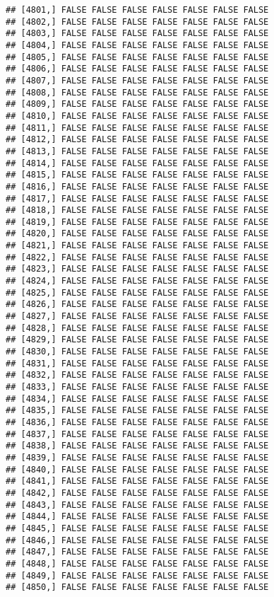 \documentclass[
]{article}
\begin{document}
\begin{verbatim}
## [4801,] FALSE FALSE FALSE FALSE FALSE FALSE FALSE
## [4802,] FALSE FALSE FALSE FALSE FALSE FALSE FALSE
## [4803,] FALSE FALSE FALSE FALSE FALSE FALSE FALSE
## [4804,] FALSE FALSE FALSE FALSE FALSE FALSE FALSE
## [4805,] FALSE FALSE FALSE FALSE FALSE FALSE FALSE
## [4806,] FALSE FALSE FALSE FALSE FALSE FALSE FALSE
## [4807,] FALSE FALSE FALSE FALSE FALSE FALSE FALSE
## [4808,] FALSE FALSE FALSE FALSE FALSE FALSE FALSE
## [4809,] FALSE FALSE FALSE FALSE FALSE FALSE FALSE
## [4810,] FALSE FALSE FALSE FALSE FALSE FALSE FALSE
## [4811,] FALSE FALSE FALSE FALSE FALSE FALSE FALSE
## [4812,] FALSE FALSE FALSE FALSE FALSE FALSE FALSE
## [4813,] FALSE FALSE FALSE FALSE FALSE FALSE FALSE
## [4814,] FALSE FALSE FALSE FALSE FALSE FALSE FALSE
## [4815,] FALSE FALSE FALSE FALSE FALSE FALSE FALSE
## [4816,] FALSE FALSE FALSE FALSE FALSE FALSE FALSE
## [4817,] FALSE FALSE FALSE FALSE FALSE FALSE FALSE
## [4818,] FALSE FALSE FALSE FALSE FALSE FALSE FALSE
## [4819,] FALSE FALSE FALSE FALSE FALSE FALSE FALSE
## [4820,] FALSE FALSE FALSE FALSE FALSE FALSE FALSE
## [4821,] FALSE FALSE FALSE FALSE FALSE FALSE FALSE
## [4822,] FALSE FALSE FALSE FALSE FALSE FALSE FALSE
## [4823,] FALSE FALSE FALSE FALSE FALSE FALSE FALSE
## [4824,] FALSE FALSE FALSE FALSE FALSE FALSE FALSE
## [4825,] FALSE FALSE FALSE FALSE FALSE FALSE FALSE
## [4826,] FALSE FALSE FALSE FALSE FALSE FALSE FALSE
## [4827,] FALSE FALSE FALSE FALSE FALSE FALSE FALSE
## [4828,] FALSE FALSE FALSE FALSE FALSE FALSE FALSE
## [4829,] FALSE FALSE FALSE FALSE FALSE FALSE FALSE
## [4830,] FALSE FALSE FALSE FALSE FALSE FALSE FALSE
## [4831,] FALSE FALSE FALSE FALSE FALSE FALSE FALSE
## [4832,] FALSE FALSE FALSE FALSE FALSE FALSE FALSE
## [4833,] FALSE FALSE FALSE FALSE FALSE FALSE FALSE
## [4834,] FALSE FALSE FALSE FALSE FALSE FALSE FALSE
## [4835,] FALSE FALSE FALSE FALSE FALSE FALSE FALSE
## [4836,] FALSE FALSE FALSE FALSE FALSE FALSE FALSE
## [4837,] FALSE FALSE FALSE FALSE FALSE FALSE FALSE
## [4838,] FALSE FALSE FALSE FALSE FALSE FALSE FALSE
## [4839,] FALSE FALSE FALSE FALSE FALSE FALSE FALSE
## [4840,] FALSE FALSE FALSE FALSE FALSE FALSE FALSE
## [4841,] FALSE FALSE FALSE FALSE FALSE FALSE FALSE
## [4842,] FALSE FALSE FALSE FALSE FALSE FALSE FALSE
## [4843,] FALSE FALSE FALSE FALSE FALSE FALSE FALSE
## [4844,] FALSE FALSE FALSE FALSE FALSE FALSE FALSE
## [4845,] FALSE FALSE FALSE FALSE FALSE FALSE FALSE
## [4846,] FALSE FALSE FALSE FALSE FALSE FALSE FALSE
## [4847,] FALSE FALSE FALSE FALSE FALSE FALSE FALSE
## [4848,] FALSE FALSE FALSE FALSE FALSE FALSE FALSE
## [4849,] FALSE FALSE FALSE FALSE FALSE FALSE FALSE
## [4850,] FALSE FALSE FALSE FALSE FALSE FALSE FALSE

\end{verbatim}
\end{document}
